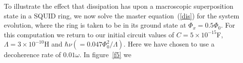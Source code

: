 \documentclass[twocolumn,a4paper,superscriptaddress,showpacs,floatfix,pra]{revtex4}
\begin{document}
To  illustrate the  effect  that dissipation  has  upon a  macroscopic
superposition  state  in  a  SQUID  ring,  we  now  solve  the  master
equation~(\ref{dis}) for the system evolution, where the ring is taken
to  be in  its  ground state  at  $\Phi _{x}=0.5\Phi  _{0}$. For  this
computation  we return  to our  initial circuit  values  of $C=5\times
10^{-15}$\textrm{F}, $\Lambda  =3\times 10^{-10}$\textrm{H} and $\hbar
\nu \left( =0.047\Phi _{0}^{2}/\Lambda  \right) $. Here we have chosen
to use a decoherence rate of $0.01\omega $.  In figure~\ref{f5} we
\begin{figure}[!t]
\begin{center}

\end{center}
\end{figure}
\end{document}
